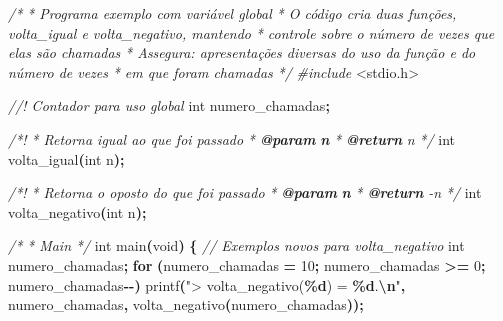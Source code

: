 \documentclass[
  11pt,
  a4paper,
]{scrbook}
\newenvironment{Shaded}{\begin{snugshade}}{\end{snugshade}}
\newcommand{\AnnotationTok}[1]{\textcolor[rgb]{0.56,0.35,0.01}{\textbf{\textit{#1}}}}
\newcommand{\CommentTok}[1]{\textcolor[rgb]{0.56,0.35,0.01}{\textit{#1}}}
\newcommand{\CommentVarTok}[1]{\textcolor[rgb]{0.56,0.35,0.01}{\textbf{\textit{#1}}}}
\newcommand{\ControlFlowTok}[1]{\textcolor[rgb]{0.13,0.29,0.53}{\textbf{#1}}}
\newcommand{\DataTypeTok}[1]{\textcolor[rgb]{0.13,0.29,0.53}{#1}}
\newcommand{\DecValTok}[1]{\textcolor[rgb]{0.00,0.00,0.81}{#1}}
\newcommand{\ImportTok}[1]{#1}
\newcommand{\NormalTok}[1]{#1}
\newcommand{\OperatorTok}[1]{\textcolor[rgb]{0.81,0.36,0.00}{\textbf{#1}}}
\newcommand{\PreprocessorTok}[1]{\textcolor[rgb]{0.56,0.35,0.01}{\textit{#1}}}
\newcommand{\SpecialCharTok}[1]{\textcolor[rgb]{0.81,0.36,0.00}{\textbf{#1}}}
\newcommand{\StringTok}[1]{\textcolor[rgb]{0.31,0.60,0.02}{#1}}
\begin{document}
\begin{Shaded}
\begin{Highlighting}[]
\CommentTok{/*}
\CommentTok{ * Programa exemplo com variável global}
\CommentTok{ * O código cria duas funções, volta\_igual e volta\_negativo, mantendo}
\CommentTok{ *      controle sobre o número de vezes que elas são chamadas}
\CommentTok{ * Assegura: apresentações diversas do uso da função e do número de vezes}
\CommentTok{ *      em que foram chamadas}
\CommentTok{ */}
\PreprocessorTok{\#include }\ImportTok{\textless{}stdio.h\textgreater{}}

\CommentTok{//! Contador para uso global}
\DataTypeTok{int}\NormalTok{ numero\_chamadas}\OperatorTok{;}

\CommentTok{/*!}
\CommentTok{ * Retorna igual ao que foi passado}
\CommentTok{ * }\AnnotationTok{@param}\CommentTok{ }\CommentVarTok{n}
\CommentTok{ * }\AnnotationTok{@return}\CommentTok{ n}
\CommentTok{ */}
\DataTypeTok{int}\NormalTok{ volta\_igual}\OperatorTok{(}\DataTypeTok{int}\NormalTok{ n}\OperatorTok{);}

\CommentTok{/*!}
\CommentTok{ * Retorna o oposto do que foi passado}
\CommentTok{ * }\AnnotationTok{@param}\CommentTok{ }\CommentVarTok{n}
\CommentTok{ * }\AnnotationTok{@return}\CommentTok{ {-}n}
\CommentTok{ */}
\DataTypeTok{int}\NormalTok{ volta\_negativo}\OperatorTok{(}\DataTypeTok{int}\NormalTok{ n}\OperatorTok{);}

\CommentTok{/*}
\CommentTok{ * Main}
\CommentTok{ */}
\DataTypeTok{int}\NormalTok{ main}\OperatorTok{(}\DataTypeTok{void}\OperatorTok{)} \OperatorTok{\{}
    \CommentTok{// Exemplos novos para volta\_negativo}
    \DataTypeTok{int}\NormalTok{ numero\_chamadas}\OperatorTok{;}
    \ControlFlowTok{for} \OperatorTok{(}\NormalTok{numero\_chamadas }\OperatorTok{=} \DecValTok{10}\OperatorTok{;}\NormalTok{ numero\_chamadas }\OperatorTok{\textgreater{}=} \DecValTok{0}\OperatorTok{;}\NormalTok{ numero\_chamadas}\OperatorTok{{-}{-})}
\NormalTok{        printf}\OperatorTok{(}\StringTok{"\textgreater{} volta\_negativo(}\SpecialCharTok{\%d}\StringTok{) = }\SpecialCharTok{\%d}\StringTok{.}\SpecialCharTok{\textbackslash{}n}\StringTok{"}\OperatorTok{,}\NormalTok{ numero\_chamadas}\OperatorTok{,}
\NormalTok{               volta\_negativo}\OperatorTok{(}\NormalTok{numero\_chamadas}\OperatorTok{));}


\end{Highlighting}
\end{Shaded}
\end{document}
